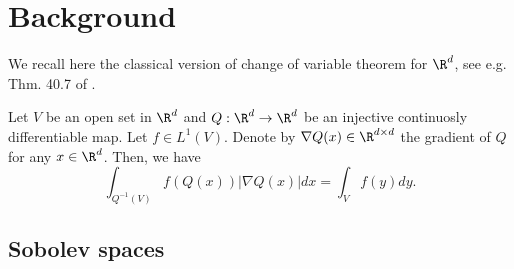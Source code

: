 \section{Background} \label{app:background}


We recall here the classical version of change of variable theorem for $\R^d$, see e.g. Thm. 40.7 of \citet{aliprantis1998principles}.
\begin{theorem}\label{thm:change-of-variable}
Let $V$ be an open set in $\R^d$ and $Q:\R^d \to \R^d$ be an injective continuosly differentiable map. Let $f \in L^1(V)$. Denote by $\nabla Q(x) \in \R^{d\times d}$ the gradient of $Q$ for any $x \in \R^d$. Then, we have
$$\int_{Q^{-1}(V)} f(Q(x)) |\nabla Q(x)| dx = \int_{V} f(y) dy. $$
\end{theorem}


\subsection{Sobolev spaces}

